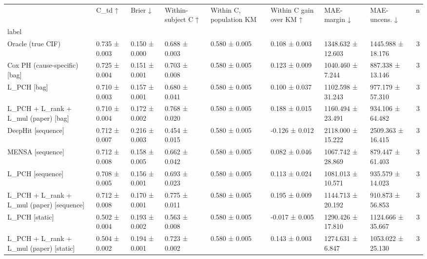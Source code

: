 \begin{tabular}{llllllllr}
\toprule
 & C\_td ↑ & Brier ↓ & Within-subject C ↑ & Within C, population KM & Within C gain over KM ↑ & MAE-margin ↓ & MAE-uncens. ↓ & n \\
label &  &  &  &  &  &  &  &  \\
\midrule
Oracle (true CIF) & 0.735 ± 0.003 & 0.150 ± 0.000 & 0.688 ± 0.003 & 0.580 ± 0.005 & 0.108 ± 0.003 & 1348.632 ± 12.603 & 1445.988 ± 18.176 & 3 \\
Cox PH (cause-specific) [bag] & 0.725 ± 0.004 & 0.151 ± 0.001 & 0.703 ± 0.008 & 0.580 ± 0.005 & 0.123 ± 0.009 & 1040.460 ± 7.244 & 887.338 ± 13.146 & 3 \\
L\_PCH [bag] & 0.710 ± 0.003 & 0.157 ± 0.001 & 0.680 ± 0.041 & 0.580 ± 0.005 & 0.100 ± 0.037 & 1102.598 ± 31.243 & 977.179 ± 57.310 & 3 \\
L\_PCH + L\_rank + L\_mul (paper) [bag] & 0.710 ± 0.004 & 0.172 ± 0.002 & 0.768 ± 0.020 & 0.580 ± 0.005 & 0.188 ± 0.015 & 1160.494 ± 23.491 & 934.106 ± 64.482 & 3 \\
DeepHit [sequence] & 0.712 ± 0.007 & 0.216 ± 0.003 & 0.454 ± 0.015 & 0.580 ± 0.005 & -0.126 ± 0.012 & 2118.000 ± 15.222 & 2509.363 ± 16.415 & 3 \\
MENSA [sequence] & 0.712 ± 0.008 & 0.158 ± 0.005 & 0.662 ± 0.042 & 0.580 ± 0.005 & 0.082 ± 0.046 & 1067.742 ± 28.869 & 879.447 ± 61.403 & 3 \\
L\_PCH [sequence] & 0.708 ± 0.005 & 0.156 ± 0.001 & 0.693 ± 0.023 & 0.580 ± 0.005 & 0.113 ± 0.024 & 1081.013 ± 10.571 & 935.579 ± 14.023 & 3 \\
L\_PCH + L\_rank + L\_mul (paper) [sequence] & 0.712 ± 0.008 & 0.170 ± 0.001 & 0.775 ± 0.011 & 0.580 ± 0.005 & 0.195 ± 0.009 & 1144.713 ± 20.192 & 910.873 ± 56.853 & 3 \\
L\_PCH [static] & 0.502 ± 0.004 & 0.193 ± 0.002 & 0.563 ± 0.008 & 0.580 ± 0.005 & -0.017 ± 0.005 & 1290.426 ± 17.810 & 1124.666 ± 35.667 & 3 \\
L\_PCH + L\_rank + L\_mul (paper) [static] & 0.504 ± 0.002 & 0.194 ± 0.001 & 0.723 ± 0.002 & 0.580 ± 0.005 & 0.143 ± 0.003 & 1274.631 ± 6.847 & 1053.022 ± 25.130 & 3 \\
\bottomrule
\end{tabular}

